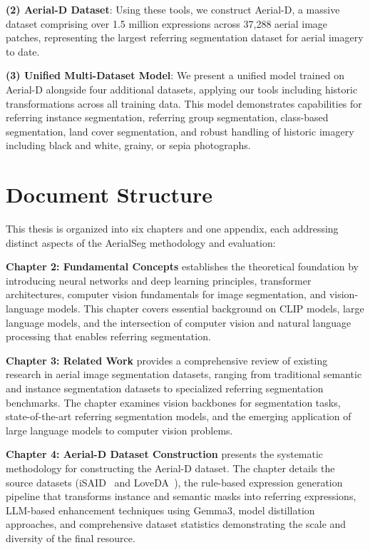 \textbf{(2) Aerial-D Dataset}: Using these tools, we construct Aerial-D, a massive dataset comprising over 1.5 million expressions across 37,288 aerial image patches, representing the largest referring segmentation dataset for aerial imagery to date.

\textbf{(3) Unified Multi-Dataset Model}: We present a unified model trained on Aerial-D alongside four additional datasets, applying our tools including historic transformations across all training data. This model demonstrates capabilities for referring instance segmentation, referring group segmentation, class-based segmentation, land cover segmentation, and robust handling of historic imagery including black and white, grainy, or sepia photographs.
\section{Document Structure}

This thesis is organized into six chapters and one appendix, each addressing distinct aspects of the AerialSeg methodology and evaluation:

\textbf{Chapter 2: Fundamental Concepts} establishes the theoretical foundation by introducing neural networks and deep learning principles, transformer architectures, computer vision fundamentals for image segmentation, and vision-language models. This chapter covers essential background on CLIP models, large language models, and the intersection of computer vision and natural language processing that enables referring segmentation.

\textbf{Chapter 3: Related Work} provides a comprehensive review of existing research in aerial image segmentation datasets, ranging from traditional semantic and instance segmentation datasets to specialized referring segmentation benchmarks. The chapter examines vision backbones for segmentation tasks, state-of-the-art referring segmentation models, and the emerging application of large language models to computer vision problems.

\textbf{Chapter 4: Aerial-D Dataset Construction} presents the systematic methodology for constructing the Aerial-D dataset. The chapter details the source datasets (iSAID~\cite{zamir2019isaid} and LoveDA~\cite{wang2021loveda}), the rule-based expression generation pipeline that transforms instance and semantic masks into referring expressions, LLM-based enhancement techniques using Gemma3, model distillation approaches, and comprehensive dataset statistics demonstrating the scale and diversity of the final resource.

